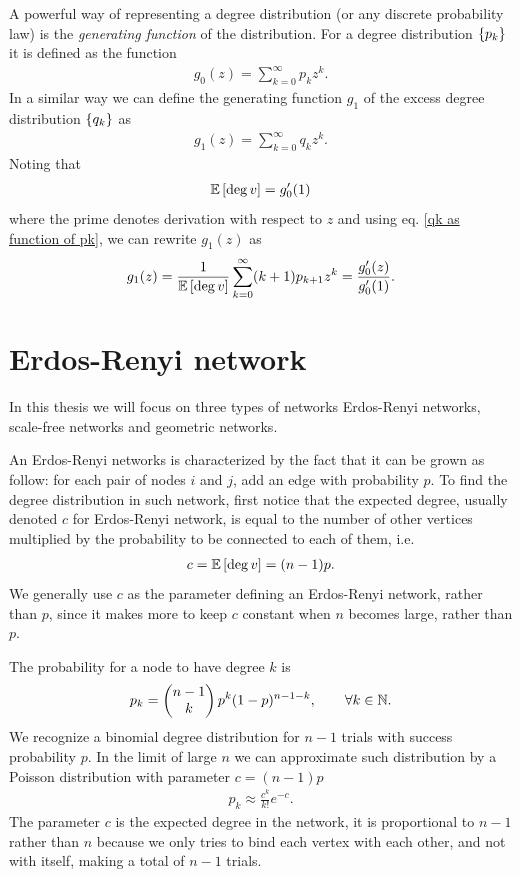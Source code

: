 \documentclass[
11pt, %
english, %
singlespacing, %
liststotoc, %
headsepline, %
]{MastersDoctoralThesis} %
\begin{document}
A powerful way of representing a degree distribution (or any discrete probability law) is the \emph{generating function} of the distribution. For a degree distribution $\{p_k\}$ it is defined as the function
\begin{align}
	g_0(z) = \sum_{k=0}^\infty p_k z^k. \label{Definition of g0}
\end{align}
In a similar way we can define the generating function $g_1$ of the excess degree distribution $\{q_k\}$ as
\begin{align}
	g_1(z) = \sum_{k=0}^\infty q_k z^k. \label{Definition of g1}
\end{align}
Noting that
\begin{align}
	\mathbb{E}\left[ \deg{v} \right] = g'_0(1) \label{Expectation value as g'0(1)}
\end{align}
where the prime denotes derivation with respect to $z$ and using eq. \eqref{qk as function of pk}, we can rewrite $g_1(z)$ as
\begin{align}
	g_1(z) = \frac{1}{\mathbb{E}\left[ \deg{v} \right]} \sum_{k=0}^\infty (k + 1) p_{k + 1} z^k = \frac{g'_0(z)}{g'_0(1)}. \label{g1 as a function of g0}
\end{align}

\section{Erdos-Renyi network}

In this thesis we will focus on  three types of networks Erdos-Renyi networks, scale-free networks and geometric networks.

An Erdos-Renyi networks is characterized by the fact that it can be grown as follow: for each pair of nodes $i$ and $j$, add an edge with probability $p$. To find the degree distribution in such network, first notice that the expected degree, usually denoted $c$ for Erdos-Renyi network, is equal to the number of other vertices multiplied by the probability to be connected to each of them, i.e.
\begin{align}
	c = \mathbb{E}\left[ \deg{v} \right] = (n - 1) p.
\end{align}
We generally use $c$ as the parameter defining an Erdos-Renyi network, rather than $p$, since it makes more to keep $c$ constant when $n$ becomes large, rather than $p$. 

The probability for a node to have degree $k$ is
\begin{align}
	p_k = \begin{pmatrix} n-1 \\ k \end{pmatrix} p^k (1 - p)^{n - 1 - k}, \qquad \forall k \in \mathbb{N}. \label{Poisson degree distribution}
\end{align}
We recognize a binomial degree distribution for $n-1$ trials with success probability $p$. In the limit of large $n$ we can approximate such distribution by a Poisson distribution with parameter $c = (n - 1) p$
\begin{align}
	p_k \approx \frac{c^k}{k!} e^{-c}.
\end{align}
The parameter $c$ is the expected degree in the network, it is proportional to $n - 1$ rather than $n$ because we only tries to bind each vertex with each other, and not with itself, making a total of $n-1$ trials.
\end{document}
